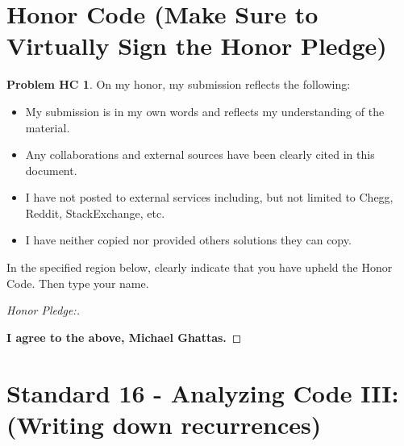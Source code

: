 \documentclass[11pt]{article}
\theoremstyle{definition}
\theoremstyle{definition}
\newtheorem*{requiredHC}{Problem HC}
\theoremstyle{definition}
\begin{document}
\section*{Honor Code (Make Sure to Virtually Sign the Honor Pledge)} 
\hypertarget{HonorCode}{}

\begin{requiredHC}
On my honor, my submission reflects the following:
\begin{itemize}
\item My submission is in my own words and reflects my understanding of the material.
\item Any collaborations and external sources have been clearly cited in this document.
\item I have not posted to external services including, but not limited to Chegg, Reddit, StackExchange, etc.
\item I have neither copied nor provided others solutions they can copy.
\end{itemize}

\noindent In the specified region below, clearly indicate that you have upheld the Honor Code. Then type your name. 
\end{requiredHC}

\begin{proof}[Honor Pledge:] \
\item \textbf{I agree to the above, Michael Ghattas.}
\end{proof}


\newpage
\section{Standard 16 - Analyzing Code III: (Writing down recurrences)}
\end{document}
